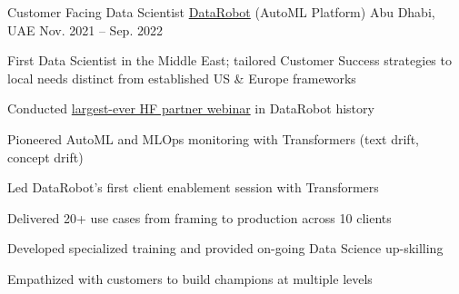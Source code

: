 \begin{cventries}
  \cventry
    {Customer Facing Data Scientist} %
    {\href{https://www.datarobot.com/}{DataRobot} (AutoML Platform)} %
    {Abu Dhabi, UAE} %
    {Nov. 2021 -- Sep. 2022} %
    {
      \begin{cvitems} %
        \item {First Data Scientist in the Middle East; tailored Customer Success strategies to local needs distinct from established US \& Europe frameworks}
      \end{cvitems}
      \vspace{2mm}
      \begin{cvsubentries}
      \end{cvsubentries}
      \vspace{4mm}
      \begin{cvitems}
        \item {Conducted \href{https://www.datarobot.com/webinars/getting-started-with-transformers-and-mlops/}{largest-ever HF partner webinar} in DataRobot history}
        \item {Pioneered AutoML and MLOps monitoring with Transformers (text drift, concept drift)}
        \item {Led DataRobot's first client enablement session with Transformers}
      \end{cvitems}
      \vspace{2mm}
      \begin{cvsubentries}
      \end{cvsubentries}
      \vspace{4mm}
      \begin{cvitems}
        \item {Delivered 20+ use cases from framing to production across 10 clients}
        \item {Developed specialized training and provided on-going Data Science up-skilling}
        \item {Empathized with customers to build champions at multiple levels}
      \end{cvitems}
      \vspace{2mm}
      \begin{cvsubentries}
      \end{cvsubentries}
      \vspace{4mm}
}
\end{cventries}
